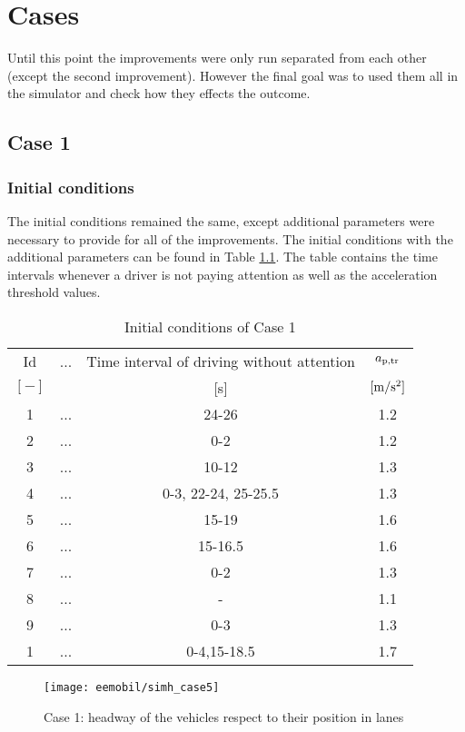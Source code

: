 \chapter{Cases}
		Until this point the improvements were only run separated from each other (except the second improvement). However the final goal was to used them all in the simulator and check how they effects the outcome.
		\section{Case 1}
			\subsection*{Initial conditions}
			The initial conditions remained the same, except additional parameters were necessary to provide for all of the improvements. The initial conditions with the additional parameters can be found in Table \ref{tab:new_array}. The table contains the time intervals whenever a driver is not paying attention as well as the acceleration threshold values.
			\begin{table}[ht]
				\begin{center}
					\begin{tabular}{ |c|c|c|c| }
						\hline
						Id & ... & Time interval of driving without attention & $a_{\rm p,tr}$\\
						$[-]$ & & [s]& $\rm [m/s^2]$\\
						\hline
						1 & ... & 24-26 & 1.2 \\
						2 & ... & 0-2 & 1.2 \\
						3 & ... & 10-12 & 1.3 \\
						4 & ... & 0-3, 22-24, 25-25.5 & 1.3 \\
						5 & ... & 15-19 & 1.6 \\
						6 & ... & 15-16.5 & 1.6 \\
						7 & ... & 0-2 & 1.3 \\
						8 & ... & - & 1.1 \\
						9 & ... & 0-3 & 1.3 \\
						1 & ... & 0-4,15-18.5 & 1.7 \\
						\hline
					\end{tabular}
				\end{center}
				\caption{Initial conditions of Case 1}
				\label{tab:new_array}
			\end{table}
			\begin{figure}
				\centering
				\texttt{[image: eemobil/simh\_case5]}
				\caption{Case 1: headway of the vehicles respect to their position in lanes}
				\label{fig:red_light_situationh2}
			\end{figure}
